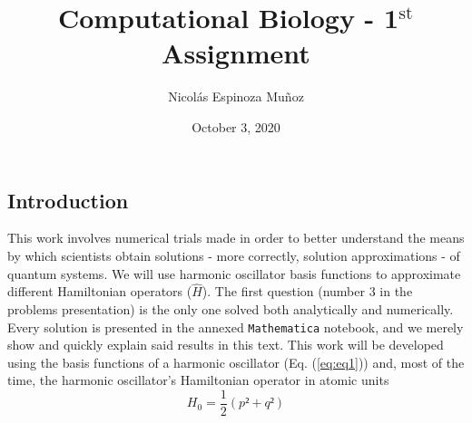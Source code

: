 \documentclass[a4paper, 12pt, notitlepage]{article}
\title{Computational Biology - 1$^\text{st}$ Assignment}
\author{Nicolás Espinoza Muñoz}
\date{October 3, 2020}
\begin{document}
\maketitle
\subsection*{Introduction}
This work involves numerical trials made in order to better understand the means by which scientists obtain solutions - more correctly, solution approximations - of quantum systems. We will use harmonic oscillator basis functions to approximate different Hamiltonian operators ($\hat{H}$). The first question (number 3 in the problems presentation) is the only one solved both analytically and numerically. Every solution is presented in the annexed \texttt{Mathematica} notebook, and we merely show and quickly explain said results in this text. This work will be developed using the  basis functions of a harmonic oscillator (Eq. (\ref{eq:eq1})) and, most of the time, the harmonic oscillator's Hamiltonian operator in atomic units
\begin{equation*}
	H_0 = \frac{1}{2}(p² + q²)
\end{equation*}
\end{document}
